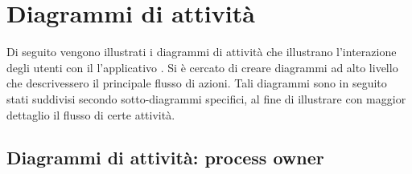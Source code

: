 \section{Diagrammi di attività}
Di seguito vengono illustrati i diagrammi di attività che illustrano l'interazione degli utenti con il l'applicativo \progetto{}.
Si è cercato di creare diagrammi ad alto livello che descrivessero il principale flusso di azioni. Tali diagrammi sono in seguito stati suddivisi secondo sotto-diagrammi specifici, al fine di illustrare con maggior dettaglio il flusso di certe attività.

\subsection{Diagrammi di attività: process owner}

